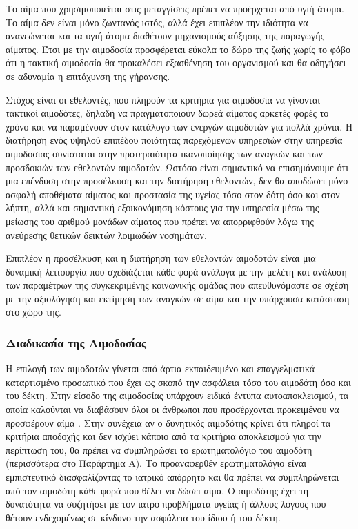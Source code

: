 	 Το αίμα που χρησιμοποιείται στις μεταγγίσεις πρέπει να προέρχεται από υγιή άτομα. Το αίμα δεν είναι μόνο ζωντανός ιστός, αλλά έχει επιπλέον την ιδιότητα να ανανεώνεται και τα υγιή άτομα διαθέτουν μηχανισμούς αύξησης της παραγωγής αίματος. Έτσι με την αιμοδοσία προσφέρεται εύκολα το δώρο της ζωής χωρίς το φόβο ότι η τακτική αιμοδοσία θα προκαλέσει εξασθένηση του οργανισμού και θα οδηγήσει σε αδυναμία η επιτάχυνση της γήρανσης.
	 
	Στόχος είναι οι εθελοντές, που πληρούν τα κριτήρια για αιμοδοσία να γίνονται τακτικοί αιμοδότες, δηλαδή να πραγματοποιούν δωρεά αίματος αρκετές φορές το χρόνο και να παραμένουν στον κατάλογο των ενεργών αιμοδοτών για πολλά χρόνια. Η διατήρηση ενός υψηλού επιπέδου ποιότητας παρεχόμενων υπηρεσιών στην υπηρεσία αιμοδοσίας συνίσταται στην προτεραιότητα ικανοποίησης των αναγκών και των προσδοκιών των εθελοντών αιμοδοτών. Ωστόσο είναι σημαντικό να επισημάνουμε ότι μια επένδυση στην προσέλκυση και την διατήρηση εθελοντών, δεν θα αποδώσει μόνο ασφαλή αποθέματα αίματος και προστασία της υγείας τόσο στον δότη όσο και στον λήπτη, αλλά και σημαντική εξοικονόμηση κόστους για την υπηρεσία μέσω της μείωσης του αριθμού μονάδων αίματος που πρέπει να απορριφθούν λόγω της ανεύρεσης θετικών δεικτών λοιμωδών νοσημάτων. 
	
	Επιπλέον η προσέλκυση και η διατήρηση των εθελοντών αιμοδοτών είναι μια δυναμική λειτουργία που σχεδιάζεται κάθε φορά ανάλογα με την μελέτη και ανάλυση των παραμέτρων της συγκεκριμένης κοινωνικής ομάδας που απευθυνόμαστε σε σχέση με την αξιολόγηση και εκτίμηση των αναγκών σε αίμα και την υπάρχουσα κατάσταση στο χώρο της.
		\subsubsection{Διαδικασία της Αιμοδοσίας}
		 Η επιλογή των αιμοδοτών γίνεται από άρτια εκπαιδευμένο και επαγγελματικά καταρτισμένο προσωπικό που έχει ως σκοπό την ασφάλεια τόσο του αιμοδότη όσο και του δέκτη. Στην είσοδο της αιμοδοσίας υπάρχουν ειδικά έντυπα αυτοαποκλεισμού, τα οποία καλούνται να διαβάσουν όλοι οι άνθρωποι που προσέρχονται προκειμένου να προσφέρουν αίμα \cite{diadikasiaAimodosias}. Στην συνέχεια αν ο δυνητικός αιμοδότης κρίνει ότι πληροί τα κριτήρια αποδοχής και δεν ισχύει κάποιο από τα κριτήρια αποκλεισμού για την περίπτωση του, θα πρέπει να συμπληρώσει το ερωτηματολόγιο του αιμοδότη \cite{ekeaQuestionnaire} (περισσότερα στο Παράρτημα Α). Το προαναφερθέν ερωτηματολόγιο είναι εμπιστευτικό διασφαλίζοντας το ιατρικό απόρρητο και θα πρέπει να συμπληρώνεται από τον αιμοδότη κάθε φορά που θέλει να δώσει αίμα. Ο αιμοδότης έχει τη δυνατότητα να συζητήσει με τον ιατρό προβλήματα υγείας ή άλλους λόγους που θέτουν ενδεχομένως σε κίνδυνο την ασφάλεια του ίδιου ή του δέκτη.
		 
